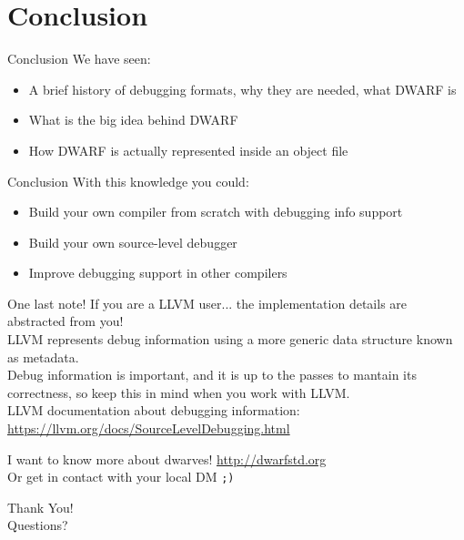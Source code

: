 
\section{Conclusion}


\begin{frame}{Conclusion}
We have seen:
\begin{itemize}
\item A brief history of debugging formats, why they are needed, what DWARF is
\item What is the big idea behind DWARF
\item How DWARF is actually represented inside an object file
\end{itemize}
\end{frame}


\begin{frame}{Conclusion}
With this knowledge you could:

\begin{itemize}
\item Build your own compiler from scratch with debugging info support
\item Build your own source-level debugger
\item Improve debugging support in other compilers
\end{itemize}
\end{frame}


\begin{frame}{One last note!}
If you are a LLVM user... the implementation details are \alert{abstracted} from you!\\
\medskip
LLVM represents debug information using a more generic data structure known
as \alert{metadata}.\\
\medskip
Debug information is important, and it is \alert{up to the passes} to mantain its
correctness, so keep this in mind when you work with LLVM.\\
\bigskip
LLVM documentation about debugging information: \url{https://llvm.org/docs/SourceLevelDebugging.html}
\end{frame}


\begin{frame}{I want to know more about dwarves!}
\Large
\centering
\vfill
\url{http://dwarfstd.org}\\
\vfill
\scriptsize
Or get in contact with your local DM \texttt{;)}
\end{frame}


\begin{frame}[plain]{}
\Huge\centering
Thank You!\\
\bigskip
\normalsize
Questions?
\end{frame}


